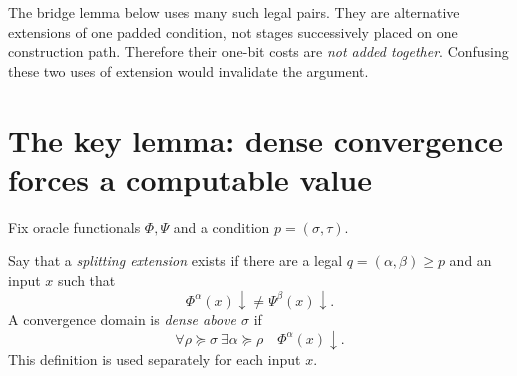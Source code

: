 \documentclass[11pt,a4paper]{article}
\theoremstyle{definition}
\theoremstyle{remark}
\begin{document}
The bridge lemma below uses many such legal pairs. They are alternative extensions of one padded condition, not stages successively placed on one construction path. Therefore their one-bit costs are \emph{not added together}. Confusing these two uses of extension would invalidate the argument.

\section{The key lemma: dense convergence forces a computable value}\label{sec:bridge}
Fix oracle functionals $\Phi,\Psi$ and a condition $p=(\sigma,\tau)$.

Say that a \emph{splitting extension} exists if there are a legal $q=(\alpha,\beta)\geq p$ and an input $x$ such that
\begin{equation}\label{eq:split}
\Phi^\alpha(x)\downarrow\ne\Psi^\beta(x)\downarrow.
\end{equation}
A convergence domain is \emph{dense above $\sigma$} if
\begin{equation}\label{eq:dense}
\forall\rho\succeq\sigma\ \exists\alpha\succeq\rho\quad
\Phi^\alpha(x)\downarrow.
\end{equation}
This definition is used separately for each input $x$.
\end{document}

